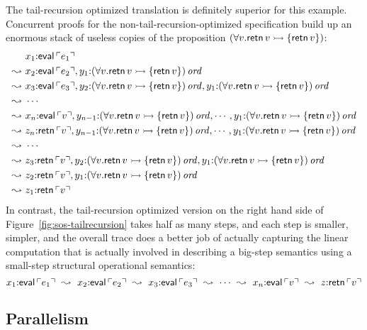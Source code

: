 The tail-recursion optimized translation is definitely superior for
this example. Concurrent proofs for the non-tail-recursion-optimized
specification build up an enormous stack of useless copies of the
proposition $(\forall v. {\sf retn}\,v \rightarrowtail \{ {\sf retn}\,v \})$:
\begin{align*}
& x_1{:}{\sf eval}\,{\ulcorner{e_1}\urcorner} \\
\leadsto ~ & x_2{:}{\sf eval}\,{\ulcorner{e_2}\urcorner}, 
  y_1{:}{(\forall v. {\sf retn}\,v \rightarrowtail \{ {\sf retn}\,v \})}\,{{\it ord}} \\
\leadsto ~ & x_3{:}{\sf eval}\,{\ulcorner{e_3}\urcorner}, 
  y_2{:}{(\forall v. {\sf retn}\,v \rightarrowtail \{ {\sf retn}\,v \})}\,{{\it ord}}, 
  y_1{:}{(\forall v. {\sf retn}\,v \rightarrowtail \{ {\sf retn}\,v \})}\,{{\it ord}} \\
\leadsto ~ & \cdots\\
\leadsto ~ & x_n{:}{\sf eval}\,{\ulcorner{v}\urcorner}, 
  y_{n-1}{:}{(\forall v. {\sf retn}\,v \rightarrowtail \{ {\sf retn}\,v \})}\,{{\it ord}}, 
  \cdots,
  y_1{:}{(\forall v. {\sf retn}\,v \rightarrowtail \{ {\sf retn}\,v \})}\,{{\it ord}} \\
\leadsto ~ & z_n{:}{\sf retn}\,{\ulcorner{v}\urcorner}, 
  y_{n-1}{:}{(\forall v. {\sf retn}\,v \rightarrowtail \{ {\sf retn}\,v \})}\,{{\it ord}}, 
  \cdots,
  y_1{:}{(\forall v. {\sf retn}\,v \rightarrowtail \{ {\sf retn}\,v \})}\,{{\it ord}} \\
\leadsto ~ & \cdots \\
\leadsto ~ & z_3{:}{\sf retn}\,{\ulcorner{v}\urcorner}, 
  y_2{:}{(\forall v. {\sf retn}\,v \rightarrowtail \{ {\sf retn}\,v \})}\,{{\it ord}}, 
  y_1{:}{(\forall v. {\sf retn}\,v \rightarrowtail \{ {\sf retn}\,v \})}\,{{\it ord}} \\
\leadsto ~ & z_2{:}{\sf retn}\,{\ulcorner{v}\urcorner}, 
  y_1{:}{(\forall v. {\sf retn}\,v \rightarrowtail \{ {\sf retn}\,v \})}\,{{\it ord}} \\
\leadsto ~ & z_1{:}{\sf retn}\,{\ulcorner{v}\urcorner}
\end{align*}
In contrast, the tail-recursion optimized version on the right hand
side of Figure~\ref{fig:sos-tailrecursion} takes half as many steps,
and each step is smaller, simpler, and the overall trace does a better
job of actually capturing the linear computation that is actually
involved in describing a big-step semantics using a small-step
structural operational semantics:
\[
x_1{:}{\sf eval}\,{\ulcorner{e_1}\urcorner} 
 ~\leadsto~
x_2{:}{\sf eval}\,{\ulcorner{e_2}\urcorner}
 ~\leadsto~
x_3{:}{\sf eval}\,{\ulcorner{e_3}\urcorner}
 ~\leadsto~ \cdots ~\leadsto~
x_n{:}{\sf eval}\,{\ulcorner{v}\urcorner}
 ~\leadsto~ 
z{:}{\sf retn}\,{\ulcorner{v}\urcorner}
\]

\subsection{Parallelism}
\label{sec:trans-par}

